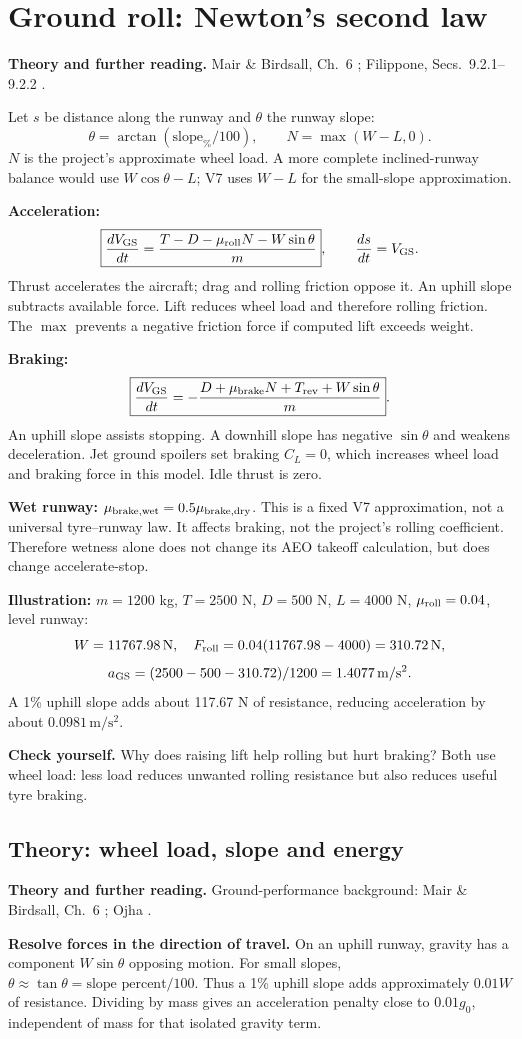 \documentclass[11pt,letterpaper]{article}
\newcommand{\unit}[1]{\,\mathrm{#1}}
\newcommand{\topic}[1]{\clearpage\section{#1}}
\newcommand{\theorypage}[1]{\clearpage\subsection*{\color{navy}\thesection\enspace Theory: #1}}
\newcommand{\reading}[1]{{\small\color{navy}\textbf{Theory and further reading.} #1\par}\vspace{3pt}}
\newcommand{\selfcheck}[1]{\par\textbf{Check yourself.} #1\par}
\begin{document}
\topic{Ground roll: Newton's second law}
\reading{Mair \& Birdsall, Ch.~6 \cite{mair}; Filippone, Secs.~9.2.1--9.2.2 \cite{filippone}.}
Let $s$ be distance along the runway and $\theta$ the runway slope:
\[
\theta=\arctan(\mathrm{slope}_{\%}/100),\qquad N=\max(W-L,0).
\]
$N$ is the project's approximate wheel load. A more complete inclined-runway
balance would use $W\cos\theta-L$; V7 uses $W-L$ for the small-slope approximation.

\textbf{Acceleration:}
\[
\boxed{\frac{dV_{\rm GS}}{dt}=\frac{T-D-\mu_{\rm roll}N-W\sin\theta}{m}},
\qquad \frac{ds}{dt}=V_{\rm GS}.
\]
Thrust accelerates the aircraft; drag and rolling friction oppose it. An uphill
slope subtracts available force. Lift reduces wheel load and therefore rolling
friction. The $\max$ prevents a negative friction force if computed lift exceeds weight.

\textbf{Braking:}
\[
\boxed{\frac{dV_{\rm GS}}{dt}=-\frac{D+\mu_{\rm brake}N+T_{\rm rev}+W\sin\theta}{m}}.
\]
An uphill slope assists stopping. A downhill slope has negative $\sin\theta$
and weakens deceleration. Jet ground spoilers set braking $C_L=0$, which
increases wheel load and braking force in this model. Idle thrust is zero.

\textbf{Wet runway:} $\mu_{\rm brake,wet}=0.5\mu_{\rm brake,dry}$.
This is a fixed V7 approximation, not a universal tyre--runway law.
It affects braking, not the project's rolling coefficient. Therefore wetness
alone does not change its AEO takeoff calculation, but does change accelerate-stop.

\textbf{Illustration:} $m=1200$ kg, $T=2500$ N, $D=500$ N,
$L=4000$ N, $\mu_{\rm roll}=0.04$, level runway:
\[
W=11767.98\unit N,\quad F_{\rm roll}=0.04(11767.98-4000)=310.72\unit N,
\]
\[
a_{\rm GS}=(2500-500-310.72)/1200=1.4077\unit{m/s^2}.
\]
A 1\% uphill slope adds about 117.67 N of resistance, reducing acceleration by
about $0.0981\unit{m/s^2}$.
\selfcheck{Why does raising lift help rolling but hurt braking? Both use wheel load:
less load reduces unwanted rolling resistance but also reduces useful tyre braking.}


\theorypage{wheel load, slope and energy}
\reading{Ground-performance background: Mair \& Birdsall, Ch.~6 \cite{mair}; Ojha \cite{ojha}.}
\textbf{Resolve forces in the direction of travel.}
On an uphill runway, gravity has a component $W\sin\theta$ opposing motion.
For small slopes, $\theta\approx\tan\theta=\text{slope percent}/100$.
Thus a 1\% uphill slope adds approximately $0.01W$ of resistance. Dividing by
mass gives an acceleration penalty close to $0.01g_0$, independent of mass
for that isolated gravity term.
\end{document}
